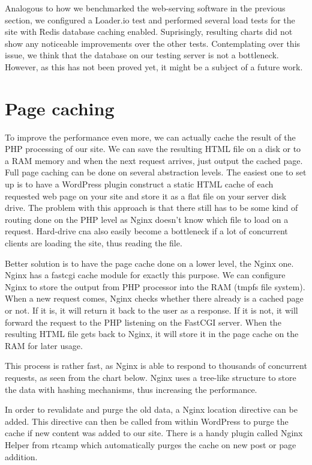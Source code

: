 Analogous to how we benchmarked the web-serving software in the previous section, we configured a Loader.io test and performed several load tests for the site with Redis database caching enabled. Suprisingly, resulting charts did not show any noticeable improvements \cite{Loader.io:nginx_hhvm_redis} over the other tests. Contemplating over this issue, we think that the database on our testing server is not a bottleneck. However, as this has not been proved yet, it might be a subject of a future work.

\section{Page caching} \label{page-caching}

To improve the performance even more, we can actually cache the result of the PHP processing of our site. We can save the resulting HTML file on a disk or to a RAM memory and when the next request arrives, just output the cached page. Full page caching can be done on several abstraction levels. The easiest one to set up is to have a WordPress plugin construct a static HTML cache of each requested web page on your site and store it as a flat file on your server disk drive. The problem with this approach is that there still has to be some kind of routing done on the PHP level as Nginx doesn't know which file to load on a request. Hard-drive cna also easily become a bottleneck if a lot of concurrent clients are loading the site, thus reading the file.

Better solution is to have the page cache done on a lower level, the Nginx one. Nginx has a fastcgi cache module for exactly this purpose. We can configure Nginx to store the output from PHP processor into the RAM (tmpfs file system). When a new request comes, Nginx checks whether there already is a cached page or not. If it is, it will return it back to the user as a response. If it is not, it will forward the request to the PHP listening on the FastCGI server. When the resulting HTML file gets back to Nginx, it will store it in the page cache on the RAM for later usage.

This process is rather fast, as Nginx is able to respond to thousands of concurrent requests, as seen from the chart below. Nginx uses a tree-like structure to store the data with hashing mechanisms, thus increasing the performance.

In order to revalidate and purge the old data, a Nginx location directive can be added. This directive can then be called from within WordPress to purge the cache if new content was added to our site. There is a handy plugin called Nginx Helper from rtcamp which automatically purges the cache on new post or page addition.

